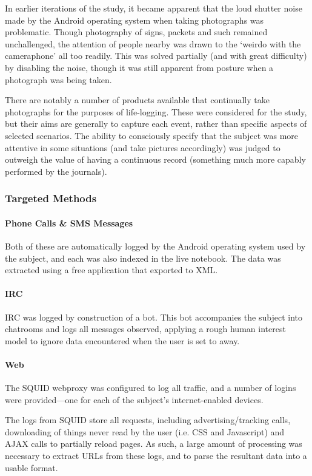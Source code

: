 In earlier iterations of the study, it became apparent that the loud shutter noise made by the Android operating system when taking photographs was problematic.  Though photography of signs, packets and such remained unchallenged, the attention of people nearby was drawn to the `weirdo with the cameraphone' all too readily.  This was solved partially (and with great difficulty) by disabling the noise, though it was still apparent from posture when a photograph was being taken.

There are notably a number of products available that continually take photographs for the purposes of life-logging.  These were considered for the study, but their aims are generally to capture each event, rather than specific aspects of selected scenarios.  The ability to consciously specify that the subject was more attentive in some situations (and take pictures accordingly) was judged to outweigh the value of having a continuous record (something much more capably performed by the journals).




\subsubsection{Targeted Methods}
\paragraph{Phone Calls \& SMS Messages}
Both of these are automatically logged by the Android operating system used by the subject, and each was also indexed in the live notebook.  The data was extracted using a free application that exported to XML.


\paragraph{IRC}
IRC was logged by construction of a bot.  This bot accompanies the subject into chatrooms and logs all messages observed, applying a rough human interest model to ignore data encountered when the user is set to away.


\paragraph{Web}
The SQUID webproxy was configured to log all traffic, and a number of logins were provided---one for each of the subject's internet-enabled devices.

The logs from SQUID store all requests, including advertising/tracking calls, downloading of things never read by the user (i.e. CSS and Javascript) and AJAX calls to partially reload pages.  As such, a large amount of processing was necessary to extract URLs from these logs, and to parse the resultant data into a usable format.

